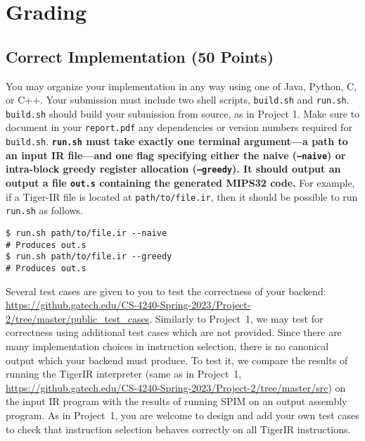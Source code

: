 \documentclass[12pt]{article}
\begin{document}
\section{Grading}
\label{sec:grading}

\subsection{Correct Implementation (50 Points)}
\label{sec:correct}
You may organize your implementation in any way using one of Java, Python, C, or C++. Your submission must include two shell scripts, \texttt{build.sh} and \texttt{run.sh}. \texttt{build.sh} should build your submission from source, as in Project 1. Make sure to document in your \texttt{report.pdf} any dependencies or version numbers required for \texttt{build.sh}. \textbf{\texttt{run.sh} must take exactly one terminal argument---a path to an input IR file---and one flag specifying either the naive (\texttt{--naive}) or intra-block greedy register allocation (\texttt{--greedy}). It should output an output a file \texttt{out.s} containing the generated MIPS32 code.} For example, if a Tiger-IR file is located at \texttt{path/to/file.ir}, then it should be possible to run \texttt{run.sh} as follows.
\begin{lstlisting}[]
$ run.sh path/to/file.ir --naive
# Produces out.s
$ run.sh path/to/file.ir --greedy
# Produces out.s
\end{lstlisting}


Several test cases are given to you to test the correctness of your backend:
\url{https://github.gatech.edu/CS-4240-Spring-2023/Project-2/tree/master/public_test_cases}. Similarly to Project~1, we may test for correctness using additional test cases which are not provided. Since there are many implementation choices in instruction selection, there is no canonical output which your backend must produce. To test it, we compare the results of running the TigerIR interpreter (same as in Project~1, \url{https://github.gatech.edu/CS-4240-Spring-2023/Project-2/tree/master/src}) on the input IR program with the results of running SPIM on an output assembly program. As in Project~1, you are welcome to design and add your own test cases to check that instruction selection behaves correctly on all TigerIR instructions.
\end{document}
